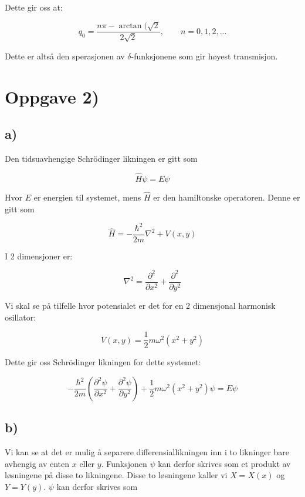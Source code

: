 \documentclass[a4paper,norsk, 10pt]{article}
\numberwithin{equation}{section}
\begin{document}
Dette gir oss at:

$$
q_0 = \frac{n\pi - \arctan(\sqrt{2}}{2\sqrt{2}}, \qquad n= 0,1,2,...
$$

Dette er altså den sperasjonen av $\delta$-funksjonene som gir høyest transmisjon.


\section{Oppgave 2)}

\subsection*{a)}

Den tidsuavhengige Schrödinger likningen er gitt som 

\begin{equation}
\hat{H}\psi = E\psi
\label{eq:TUSL}
\end{equation}

Hvor $E$ er energien til systemet, mens $\hat{H}$ er den hamiltonske operatoren. Denne er gitt som

$$
\hat{H} = -\frac{\hbar^2}{2m}\nabla^2  + V(x,y)
$$

I 2 dimensjoner er:

$$
\nabla^2 = \frac{\partial^2}{\partial x^2} + \frac{\partial^2}{\partial y^2}
$$

Vi skal se på tilfelle hvor potensialet er det for en 2 dimensjonal harmonisk osillator:

$$
V(x,y) = \frac{1}{2}m\omega^2(x^2 + y^2)
$$

Dette gir oss Schrödinger likningen for dette systemet:

\begin{equation}
-\frac{\hbar^2}{2m}\left(\frac{\partial^2 \psi}{\partial x^2} + \frac{\partial^2 \psi}{\partial y^2}\right) + \frac{1}{2}m\omega^2(x^2 + y^2)\psi = E\psi
\label{eq:2dSch}
\end{equation}

\subsection*{b)}

Vi kan se at det er mulig å separere differensiallikningen inn i to likninger bare avhengig av enten $x$ eller $y$. Funksjonen $\psi$ kan derfor skrives som et produkt av løsningene på disse to likningene. Disse to løsningene kaller vi $X = X(x)$ og $Y = Y(y)$. $\psi$ kan derfor skrives som
\end{document}
